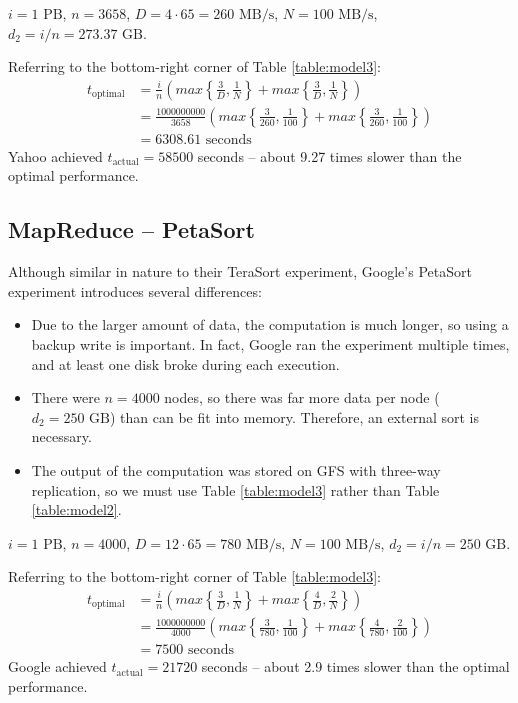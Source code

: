 \documentclass{acm_proc_article-sp}
\begin{document}
$i = 1 \text{ PB}$, $n = 3658$, $D = 4 \cdot 65 = 260 \text{ MB/s}$, $N = 100 \text{ MB/s}$, $d_2 = i/n = 273.37 \text{ GB}$.

Referring to the bottom-right corner of Table \ref{table:model3}:
\begin{align*}
t_\text{optimal} &= \frac{i}{n} \left( max\left\{\frac{3}{D}, \frac{1}{N}\right\} + max\left\{\frac{3}{D}, \frac{1}{N}\right\} \right)\\
  &= \frac{1000000000}{3658} \left( max\left\{\frac{3}{260}, \frac{1}{100}\right\} + max\left\{\frac{3}{260}, \frac{1}{100}\right\} \right)\\
  &= 6308.61 \text{ seconds}
\end{align*}
Yahoo achieved $t_\text{actual} = 58500$ seconds -- about 9.27 times slower than the optimal performance.

\subsection{MapReduce -- PetaSort}

Although similar in nature to their TeraSort experiment, Google's PetaSort experiment introduces several differences:
\begin{itemize}
  \item Due to the larger amount of data, the computation is much longer, so using a backup write is important. In fact, Google ran the experiment multiple times, and at least one disk broke during each execution.
  \item There were $n = 4000$ nodes, so there was far more data per node ($d_2 = 250 \text{ GB}$) than can be fit into memory. Therefore, an external sort is necessary.
  \item The output of the computation was stored on GFS with three-way replication, so we must use Table \ref{table:model3} rather than Table \ref{table:model2}.
\end{itemize}

$i = 1 \text{ PB}$, $n = 4000$, $D = 12 \cdot 65 = 780 \text{ MB/s}$, $N = 100 \text{ MB/s}$, $d_2 = i/n = 250 \text{ GB}$.

Referring to the bottom-right corner of Table \ref{table:model3}:
\begin{align*}
t_\text{optimal} &= \frac{i}{n} \left( max\left\{\frac{3}{D}, \frac{1}{N}\right\} + max\left\{\frac{4}{D}, \frac{2}{N}\right\} \right)\\
  &= \frac{1000000000}{4000} \left( max\left\{\frac{3}{780}, \frac{1}{100}\right\} + max\left\{\frac{4}{780}, \frac{2}{100}\right\} \right)\\
  &= 7500 \text{ seconds}
\end{align*}
Google achieved $t_\text{actual} = 21720$ seconds -- about 2.9 times slower than the optimal performance.
\end{document}
